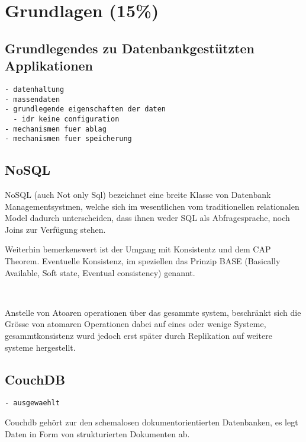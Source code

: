 \chapter{Grundlagen (15\%)}

\section{Grundlegendes zu Datenbankgest\"utzten Applikationen}

\begin{verbatim}
- datenhaltung
- massendaten
- grundlegende eigenschaften der daten
  - idr keine configuration
- mechanismen fuer ablag
- mechanismen fuer speicherung
\end{verbatim}




\section{NoSQL}

NoSQL (auch Not only Sql) bezeichnet eine breite Klasse
von Datenbank Managementsystmen, welche sich im wesentlichen
vom traditionellen relationalen Model dadurch unterscheiden,
dass ihnen weder SQL als Abfragesprache, noch Joins zur Verfügung stehen.
~ \cite{wikipedia:nosql}



Weiterhin bemerkenswert ist der Umgang mit Konsistentz und dem CAP Theorem.
Eventuelle Konsistenz, im speziellen das Prinzip BASE (Basically Available, Soft state, Eventual consistency) genannt.

~ \cite{wikipedia:base}

Anstelle von Atoaren operationen über das gesammte system,
beschränkt sich die Grösse von atomaren Operationen dabei auf eines 
oder wenige Systeme, gesammtkonsistenz wurd jedoch erst später durch Replikation auf weitere systeme hergestellt.




\section{CouchDB}


\begin{verbatim}
- ausgewaehlt

\end{verbatim}

Couchdb gehört zur den schemalosen dokumentorientierten Datenbanken,
es legt Daten in Form von strukturierten Dokumenten ab.

